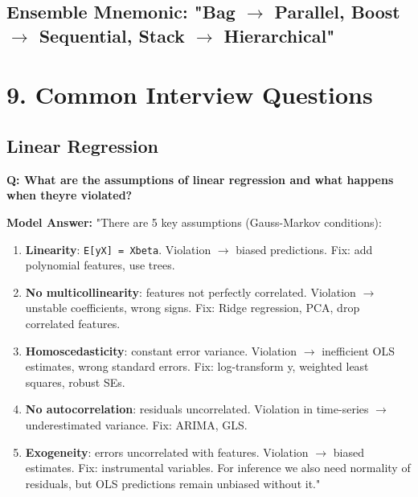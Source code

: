 \documentclass[11pt]{article}
\providecommand{\tightlist}{\setlength{\itemsep}{1pt}\setlength{\parskip}{0pt}}
\begin{document}
\subsection{\texorpdfstring{Ensemble Mnemonic: "Bag \(\rightarrow\) Parallel, Boost \(\rightarrow\) Sequential, Stack \(\rightarrow\) Hierarchical"}{Ensemble Mnemonic: "Bag \textbackslash rightarrow Parallel, Boost \textbackslash rightarrow Sequential, Stack \textbackslash rightarrow Hierarchical"}}\label{ensemble-mnemonic-bag-rightarrow-parallel-boost-rightarrow-sequential-stack-rightarrow-hierarchical}

\section{9. Common Interview Questions}\label{9-common-interview-questions}

\subsection{Linear Regression}\label{linear-regression-1}

\textbf{Q: What are the assumptions of linear regression and what happens when they\textquotesingle re violated?}

\textbf{Model Answer:}
"There are 5 key assumptions (Gauss-Markov conditions):

\begin{enumerate}
\def\labelenumi{\arabic{enumi}.}
\tightlist
\item
  \textbf{Linearity}: \texttt{E{[}y\textbar{}X{]}\ =\ Xbeta}. Violation \(\rightarrow\) biased predictions. Fix: add polynomial features, use trees.
\item
  \textbf{No multicollinearity}: features not perfectly correlated. Violation \(\rightarrow\) unstable coefficients, wrong signs. Fix: Ridge regression, PCA, drop correlated features.
\item
  \textbf{Homoscedasticity}: constant error variance. Violation \(\rightarrow\) inefficient OLS estimates, wrong standard errors. Fix: log-transform y, weighted least squares, robust SEs.
\item
  \textbf{No autocorrelation}: residuals uncorrelated. Violation in time-series \(\rightarrow\) underestimated variance. Fix: ARIMA, GLS.
\item
  \textbf{Exogeneity}: errors uncorrelated with features. Violation \(\rightarrow\) biased estimates. Fix: instrumental variables.
  For inference we also need normality of residuals, but OLS predictions remain unbiased without it."
\end{enumerate}
\end{document}
